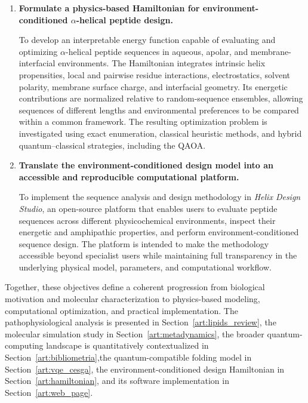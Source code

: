 \begin{enumerate}
\item \textbf{Formulate a physics-based Hamiltonian for environment-conditioned $\alpha$-helical peptide design.}

To develop an interpretable energy function capable of evaluating and optimizing $\alpha$-helical peptide sequences in aqueous, apolar, and membrane-interfacial environments. The Hamiltonian integrates intrinsic helix propensities, local and pairwise residue interactions, electrostatics, solvent polarity, membrane surface charge, and interfacial geometry. Its energetic contributions are normalized relative to random-sequence ensembles, allowing sequences of different lengths and environmental preferences to be compared within a common framework. The resulting optimization problem is investigated using exact enumeration, classical heuristic methods, and hybrid quantum--classical strategies, including the QAOA.

\item \textbf{Translate the environment-conditioned design model into an accessible and reproducible computational platform.}

To implement the sequence analysis and design methodology in \textit{Helix Design Studio}, an open-source platform that enables users to evaluate peptide sequences across different physicochemical environments, inspect their energetic and amphipathic properties, and perform environment-conditioned sequence design. The platform is intended to make the methodology accessible beyond specialist users while maintaining full transparency in the underlying physical model, parameters, and computational workflow.

\end{enumerate}

Together, these objectives define a coherent progression from biological motivation and molecular characterization to physics-based modeling, computational optimization, and practical implementation. The pathophysiological analysis is presented in Section~\ref{art:lipids_review}, the molecular simulation study in Section~\ref{art:metadynamics}, the broader quantum-computing landscape is quantitatively contextualized in Section~\ref{art:bibliometria},the quantum-compatible folding model in Section~\ref{art:vqe_cesga}, the environment-conditioned design Hamiltonian in Section~\ref{art:hamiltonian}, and its software implementation in Section~\ref{art:web_page}.
